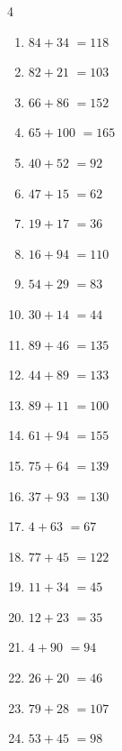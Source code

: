 \begin{multicols}{4}
\begin{enumerate}
  \item $84+34$
        $=118$

  \item $82+21$
        $=103$

  \item $66+86$
        $=152$

  \item $65+100$
        $=165$

  \item $40+52$
        $=92$

  \item $47+15$
        $=62$

  \item $19+17$
        $=36$

  \item $16+94$
        $=110$

  \item $54+29$
        $=83$

  \item $30+14$
        $=44$

  \item $89+46$
        $=135$

  \item $44+89$
        $=133$

  \item $89+11$
        $=100$

  \item $61+94$
        $=155$

  \item $75+64$
        $=139$

  \item $37+93$
        $=130$

  \item $4+63$
        $=67$

  \item $77+45$
        $=122$

  \item $11+34$
        $=45$

  \item $12+23$
        $=35$

  \item $4+90$
        $=94$

  \item $26+20$
        $=46$

  \item $79+28$
        $=107$

  \item $53+45$
        $=98$


\end{enumerate}
\end{multicols}
